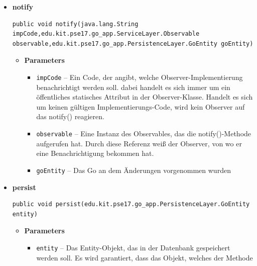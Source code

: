 \documentclass[11pt,a4paper]{article}
\begin{document}
{{{{{{{{{{{{\begin{itemize}
{\begin{itemize}
{}%
\end{itemize}
}%
\item{ 
\hypertarget{edu.kit.pse17.go_app.PersistenceLayer.daos.GoDaoImp.notify(java.lang.String, edu.kit.pse17.go_app.ServiceLayer.Observable, edu.kit.pse17.go_app.PersistenceLayer.GoEntity)}{{\bf  notify}\\}
\begin{lstlisting}[frame=none]
public void notify(java.lang.String impCode,edu.kit.pse17.go_app.ServiceLayer.Observable observable,edu.kit.pse17.go_app.PersistenceLayer.GoEntity goEntity)\end{lstlisting} %
\begin{itemize}
\item{
{\bf  Parameters}
  \begin{itemize}
   \item{
\texttt{impCode} -- Ein Code, der angibt, welche Observer-Implementierung benachrichtigt werden soll. dabei handelt es sich immer um ein öffentliches statisches Attribut in der Observer-Klasse. Handelt es sich um keinen gültigen Implementierungs-Code, wird kein Observer auf das notify() reagieren.}
   \item{
\texttt{observable} -- Eine Instanz des Observables, das die notify()-Methode aufgerufen hat. Durch diese Referenz weiß der Observer, von wo er eine Benachrichtigung bekommen hat.}
   \item{
\texttt{goEntity} -- Das Go an dem Änderungen vorgenommen wurden}
  \end{itemize}
}%
\end{itemize}
}%
\item{ 
\hypertarget{edu.kit.pse17.go_app.PersistenceLayer.daos.GoDaoImp.persist(edu.kit.pse17.go_app.PersistenceLayer.GoEntity)}{{\bf  persist}\\}
\begin{lstlisting}[frame=none]
public void persist(edu.kit.pse17.go_app.PersistenceLayer.GoEntity entity)\end{lstlisting} %
\begin{itemize}
\item{
{\bf  Parameters}
  \begin{itemize}
   \item{
\texttt{entity} -- Das Entity-Objekt, das in der Datenbank gespeichert werden soll. Es wird garantiert, dass das Objekt, welches der Methode}
  \end{itemize}
}
\end{itemize}}
\end{itemize}}}}}}}}}}}}}
\end{document}
